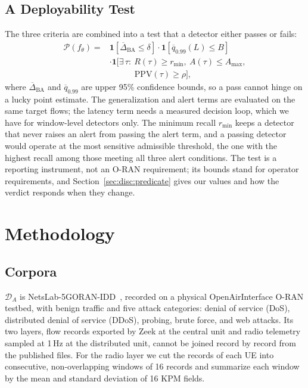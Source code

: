 \documentclass{ieeeaccess}
\newcommand{\DA}{\ensuremath{\mathcal{D}_{A}}}
\newcommand{\ind}{\ensuremath{\mathbf{1}}}
\begin{document}
\subsection{A Deployability Test}
\label{sec:crit:test}

The three criteria are combined into a test that a detector either passes or fails:
\begin{equation}
\begin{split}
\mathcal{P}(f_{\theta}) = {} & \ind\!\left[\overline{\Delta}_{\mathrm{BA}} \le \delta\right] \cdot \ind\!\left[\overline{q}_{0.99}(L) \le B\right] \\
& \cdot \ind\!\big[\exists\,\tau:\ R(\tau)\ge r_{\min},\ A(\tau) \le A_{\max}, \\
& \qquad\quad \mathrm{PPV}(\tau) \ge \rho\big],
\end{split}
\label{eq:deploy}
\end{equation}
where $\overline{\Delta}_{\mathrm{BA}}$ and $\overline{q}_{0.99}$ are upper 95\% confidence bounds, so a pass cannot hinge on a lucky point estimate. The generalization and alert terms are evaluated on the same target flows; the latency term needs a measured decision loop, which we have for window-level detectors only. The minimum recall $r_{\min}$ keeps a detector that never raises an alert from passing the alert term, and a passing detector would operate at the most sensitive admissible threshold, the one with the highest recall among those meeting all three alert conditions. The test is a reporting instrument, not an O-RAN requirement; its bounds stand for operator requirements, and Section~\ref{sec:disc:predicate} gives our values and how the verdict responds when they change.

\section{Methodology}
\label{sec:method}

\subsection{Corpora}
\label{sec:corpora}

\DA{} is NetsLab-5GORAN-IDD~\cite{abedzadeh2025netslab}, recorded on a physical OpenAirInterface O-RAN testbed, with benign traffic and five attack categories: denial of service (DoS), distributed denial of service (DDoS), probing, brute force, and web attacks. Its two layers, flow records exported by Zeek at the central unit and radio telemetry sampled at 1\,Hz at the distributed unit, cannot be joined record by record from the published files. For the radio layer we cut the records of each UE into consecutive, non-overlapping windows of 16 records and summarize each window by the mean and standard deviation of 16 KPM fields.
\end{document}
